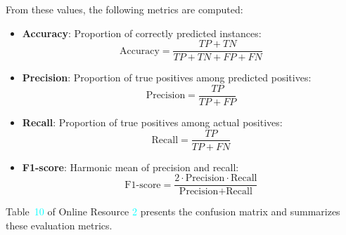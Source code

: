 \documentclass[10pt,twocolumn]{article}
\begin{document}
From these values, the following metrics are computed:
\begin{itemize}
\item \textbf{Accuracy}: Proportion of correctly predicted instances:
\[ \text{Accuracy} = \frac{TP + TN}{TP + TN + FP + FN} \]
\item \textbf{Precision}: Proportion of true positives among predicted positives:
\[ \text{Precision} = \frac{TP}{TP + FP} \]
\item \textbf{Recall}: Proportion of true positives among actual positives:
\[ \text{Recall} = \frac{TP}{TP + FN} \]
\item \textbf{F1-score}: Harmonic mean of precision and recall:
\[ \text{F1-score} = \frac{2 \cdot \text{Precision} \cdot \text{Recall}}{\text{Precision} + \text{Recall}} \]
\end{itemize}

Table~\textcolor{cyan}{10}  of  Online Resource \textcolor{cyan}{2} presents the confusion matrix and summarizes these evaluation metrics.


%
%
%
%
%
%
%
%
%
%
%
%


\end{document}
